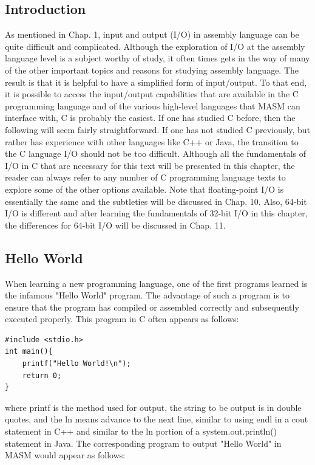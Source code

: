 \documentclass[10pt]{article}
\begin{document}
\subsection*{Introduction}
As mentioned in Chap. 1, input and output (I/O) in assembly language can be quite difficult and complicated. Although the exploration of I/O at the assembly language level is a subject worthy of study, it often times gets in the way of many of the other important topics and reasons for studying assembly language. The result is that it is helpful to have a simplified form of input/output. To that end, it is possible to access the input/output capabilities that are available in the C programming language and of the various high-level languages that MASM can interface with, C is probably the easiest. If one has studied C before, then the following will seem fairly straightforward. If one has not studied C previously, but rather has experience with other languages like C++ or Java, the transition to the C language I/O should not be too difficult. Although all the fundamentals of I/O in C that are necessary for this text will be presented in this chapter, the reader can always refer to any number of C programming language texts to explore some of the other options available. Note that floating-point I/O is essentially the same and the subtleties will be discussed in Chap. 10. Also, 64-bit I/O is different and after learning the fundamentals of 32-bit I/O in this chapter, the differences for 64-bit I/O will be discussed in Chap. 11.

\subsection*{Hello World}
When learning a new programming language, one of the first programs learned is the infamous "Hello World" program. The advantage of such a program is to ensure that the program has compiled or assembled correctly and subsequently executed properly. This program in C often appears as follows:

\begin{verbatim}
#include <stdio.h>
int main(){
    printf("Hello World!\n");
    return 0;
}
\end{verbatim}

where printf is the method used for output, the string to be output is in double quotes, and the ln means advance to the next line, similar to using endl in a cout statement in C++ and similar to the ln portion of a system.out.println() statement in Java. The corresponding program to output "Hello World" in MASM would appear as follows:
\end{document}
